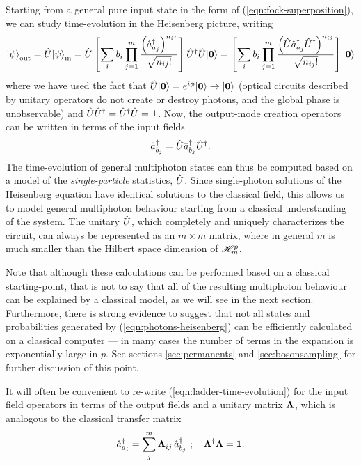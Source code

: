 Starting from a general pure input state in the form of (\ref{eqn:fock-superposition}), 
we can study time-evolution in the Heisenberg picture, writing
\begin{gather}
    \mbox{$ | \psi \rangle $}_{\mathrm{out}} = 
    \hat{U} 
    \mbox{$ | \psi \rangle $}_{\mathrm{in}}
    =
    \hat{U} 
    \left[
    \sum_i 
    b_i 
    \prod_{j=1}^m 
    \frac{\left( \hat{a}^{\dagger}_{a_j} \right) ^{n_{ij}}}{\sqrt{n_{ij}!}}
    \right]\hat{U}^\dagger \hat{U} \mbox{$ | \mathbf{0} \rangle $}
    =
    \left[
    \sum_i 
    b_i 
    \prod_{j=1}^m 
    \frac{\left( \hat{U} \hat{a}^{\dagger}_{a_j} \hat{U}^\dagger \right) ^{n_{ij}}}{\sqrt{n_{ij}!}}
    \right]\mbox{$ | \mathbf{0} \rangle $}
    \label{eqn:photons-heisenberg}
\end{gather}
where we have used the fact that $\hat{U}\mbox{$ | \mathbf{0} \rangle $}=e^{i\phi}\mbox{$ | \mathbf{0} \rangle $} \rightarrow \mbox{$ | \mathbf{0} \rangle $}$ (optical circuits described by unitary operators do not create or destroy photons, and the global phase is unobservable) and $\hat{U} \hat{U}^\dagger = \hat{U}^\dagger \hat{U} = \mathbf{1}$. Now, the output-mode creation operators can be written in terms of the input fields
\begin{equation}
    \hat{a}^{\dagger}_{b_j} = \hat{U} \hat{a}^{\dagger}_{b_j} \hat{U}^\dagger.
    \label{eqn:ladder-time-evolution}
\end{equation}
The time-evolution of general multiphoton states can thus be computed based on a model of the \emph{single-particle} statistics, $\hat{U}$. Since single-photon solutions of the Heisenberg equation have identical solutions to the classical field, this allows us to model general multiphoton behaviour starting from a classical understanding of the system.
The unitary $\hat{U}$, which completely and uniquely characterizes the circuit, can always be represented as an $m \times m$ matrix, where in general $m$ is much smaller than the Hilbert space dimension of $\mathscr{H}_m^p$.  
%

Note that although these calculations can be performed based on a classical starting-point, that is not to say that all of the resulting multiphoton behaviour can be explained by a classical model, as we will see in the next section.  Furthermore, there is strong evidence to suggest that not all states and probabilities generated by (\ref{eqn:photons-heisenberg}) can be efficiently calculated on a classical computer --- in many cases the number of terms in the expansion is exponentially large in $p$. See sections \ref{sec:permanents} and \ref{sec:bosonsampling} for further discussion of this point.

It will often be convenient to re-write (\ref{eqn:ladder-time-evolution}) for the input field operators in terms of the output fields and a unitary matrix $\mathbf{\Lambda}$, which is analogous to the classical transfer matrix
\begin{equation}
    \hat{a}^{\dagger}_{a_i} = \sum_j^m \mathbf{\mathbf{\Lambda}}_{ij}\, \hat{a}^{\dagger}_{b_j}~;\quad \mathbf{\Lambda}^\dagger \mathbf{\Lambda} = \mathbf{1}.
\end{equation}

